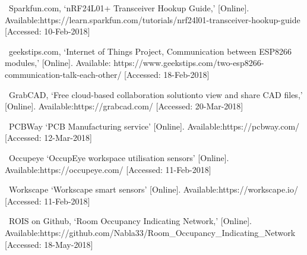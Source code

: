 \begin{thebibliography}{}
	
~Sparkfun.com, `nRF24L01+ Transceiver Hookup Guide,' [Online].
Available:https://learn.sparkfun.com/tutorials/nrf24l01-transceiver-hookup-guide 
[Accessed: 10-Feb-2018]

~geekstips.com, `Internet of Things Project, Communication between ESP8266 modules,' [Online]. Available: https://www.geekstips.com/two-esp8266-communication-talk-each-other/ [Accessed: 18-Feb-2018] 

~GrabCAD, `Free cloud-based collaboration solutionto view and share CAD files,' [Online].
Available:https://grabcad.com/ [Accessed: 20-Mar-2018]

~PCBWay `PCB Manufacturing service'  [Online].
Available:https://pcbway.com/ [Accessed: 12-Mar-2018]

~Occupeye `OccupEye workspace utilisation sensors'  [Online].
Available:https://occupeye.com/ [Accessed: 11-Feb-2018]

~Workscape `Workscape smart sensors'  [Online].
Available:https://workscape.io/ [Accessed: 11-Feb-2018]

~ROIS on Github, `Room Occupancy Indicating Network,'  [Online].
Available:https://github.com/Nabla33/Room\_Occupancy\_Indicating\_Network [Accessed: 18-May-2018]



\end{thebibliography}
